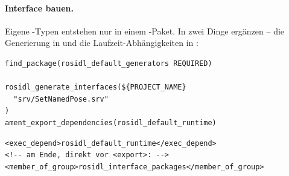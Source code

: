 \paragraph{Interface bauen.} Eigene -Typen entstehen nur in einem
-Paket. In  zwei Dinge ergänzen --
die Generierung in  und die Laufzeit-Abhängigkeiten in
:
\begin{lstlisting}[style=bash,caption={\code{p0a\_arm\_interfaces/CMakeLists.txt} (Ergänzung)}]
find_package(rosidl_default_generators REQUIRED)

rosidl_generate_interfaces(${PROJECT_NAME}
  "srv/SetNamedPose.srv"
)
ament_export_dependencies(rosidl_default_runtime)
\end{lstlisting}
\begin{lstlisting}[style=xml,caption={\code{p0a\_arm\_interfaces/package.xml} (Ergänzung)}]
<exec_depend>rosidl_default_runtime</exec_depend>
<!-- am Ende, direkt vor <export>: -->
<member_of_group>rosidl_interface_packages</member_of_group>
\end{lstlisting}

